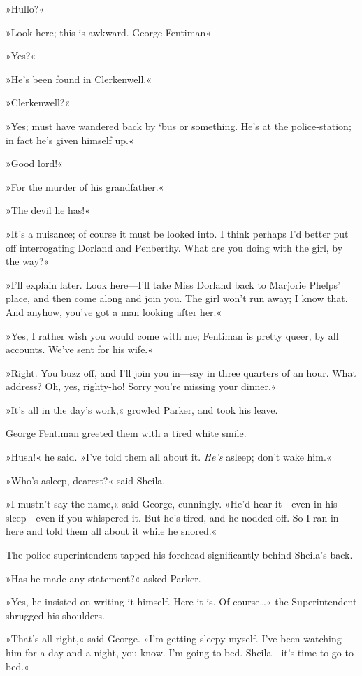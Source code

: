 »Hullo?«

»Look here; this is awkward. George Fentiman\longdash«

»Yes?«

»He's been found in Clerkenwell.«

»Clerkenwell?«

»Yes; must have wandered back by `bus or something. He's at the police-station; in fact he's given himself up.«

»Good lord!«

»For the murder of his grandfather.«

»The devil he has!«

»It's a nuisance; of course it must be looked into. I think perhaps I'd better put off interrogating Dorland and Penberthy. What are you doing with the girl, by the way?«

»I'll explain later. Look here—I'll take Miss Dorland back to Marjorie Phelps' place, and then come along and join you. The girl won't run away; I know that. And anyhow, you've got a man looking after her.«

»Yes, I rather wish you would come with me; Fentiman is pretty queer, by all accounts. We've sent for his wife.«

»Right. You buzz off, and I'll join you in—say in three quarters of an hour. What address? Oh, yes, righty-ho! Sorry you're missing your dinner.«

»It's all in the day's work,« growled Parker, and took his leave.

George Fentiman greeted them with a tired white smile.

»Hush!« he said. »I've told them all about it. \textit{He's} asleep; don't wake him.«

»Who's asleep, dearest?« said Sheila.

»I mustn't say the name,« said George, cunningly. »He'd hear it—even in his sleep—even if you whispered it. But he's tired, and he nodded off. So I ran in here and told them all about it while he snored.«

The police superintendent tapped his forehead significantly behind Sheila's back.

»Has he made any statement?« asked Parker.

»Yes, he insisted on writing it himself. Here it is. Of course\dots« the Superintendent shrugged his shoulders.

»That's all right,« said George. »I'm getting sleepy myself. I've been watching him for a day and a night, you know. I'm going to bed. Sheila—it's time to go to bed.«

